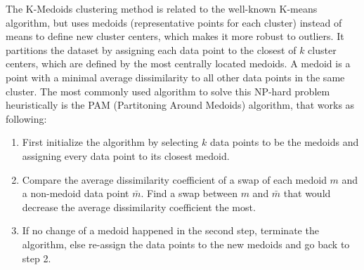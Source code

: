 The K-Medoids clustering method is related to the well-known K-means algorithm, but uses medoids (representative points for each cluster) instead of means to define new cluster centers, which makes it more robust to outliers.\cite{Jin2010} It partitions the dataset by assigning each data point to the closest of $k$ cluster centers, which are defined by the most centrally located medoids. A medoid is a point with a minimal average dissimilarity to all other data points in the same cluster. The most commonly used algorithm to solve this NP-hard problem heuristically is the PAM (Partitoning Around Medoids) algorithm, that works as following: \cite{kaufman2009finding} \\
\begin{enumerate}
	\item First initialize the algorithm by selecting $k$ data points to be the medoids and assigning every data point to its closest medoid. \\
	\item Compare the average dissimilarity coefficient of a swap of each medoid $m$ and a non-medoid data point $\bar{m}$. Find a swap between $m$ and $\bar{m}$ that would decrease the average dissimilarity coefficient the most. 
	\item If no change of a medoid happened in the second step, terminate the algorithm, else re-assign the data points to the new medoids and go back to step 2. 
\end{enumerate}

